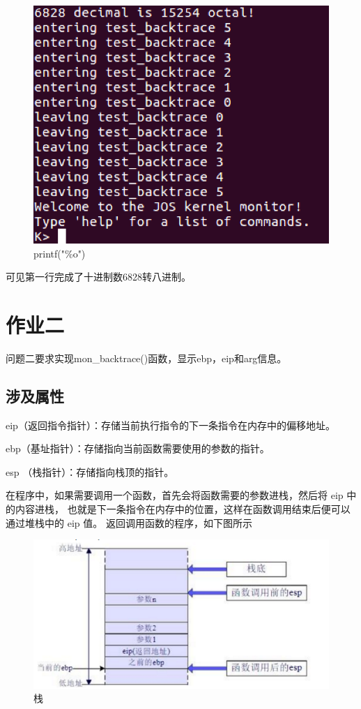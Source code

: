 \documentclass[12pt,a4paper,UTF8]{article}
\begin{document}
\begin{figure}[H]
    \centering
    \includegraphics[width = .75\linewidth]{img/h1_1.png}
    \caption{printf("\%o")}
    \label{fig::figure1}
\end{figure}

可见第一行完成了十进制数6828转八进制。

\section{作业二}

\setcounter{table}{0}
\setcounter{figure}{0}

问题二要求实现mon\_backtrace()函数，显示ebp，eip和arg信息。

	\subsection{涉及属性}
	eip（返回指令指针）：存储当前执行指令的下一条指令在内存中的偏移地址。

	ebp（基址指针）：存储指向当前函数需要使用的参数的指针。

	esp （栈指针）：存储指向栈顶的指针。

	在程序中，如果需要调用一个函数，首先会将函数需要的参数进栈，然后将 eip 中的内容进栈，
	也就是下一条指令在内存中的位置，这样在函数调用结束后便可以通过堆栈中的 eip 值。
	返回调用函数的程序，如下图所示
	\begin{figure}[H]
		\centering
		\includegraphics[width = .8\linewidth]{img/1.png}
		\caption{栈}
		\label{fig::figure2-1}
	\end{figure}
\end{document}
